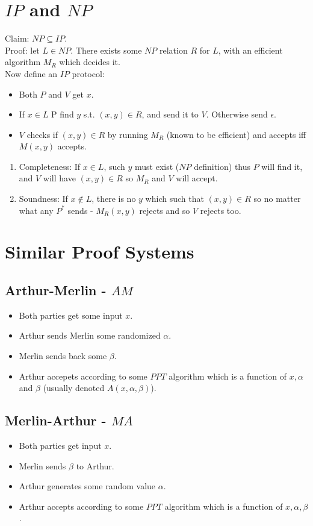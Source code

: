 \section*{$IP$ and $NP$}
Claim:
$NP\subseteq IP$.\\
Proof: let $L\in NP$.
There exists some $NP$ relation $R$ for $L$, with an efficient algorithm $M_R$ which decides it.\\
Now define an $IP$ protocol:\\
\begin{itemize}
    \item Both $P$ and $V$ get $x$.
    \item If $x\in L$ P find $y$ s.t. $(x,y)\in R$, and send it to $V$. Otherwise send $\epsilon$.
    \item $V$ checks if $(x,y)\in R$ by running $M_R$ (known to be efficient) and accepts iff $M(x,y)$ accepts.
\end{itemize}
\begin{enumerate}
    \item Completeness: If $x\in L$, such $y$ must exist ($NP$ definition) thus $P$ will find it, and $V$ will have $(x,y)\in R$ so $M_R$ and $V$ will accept.
    \item Soundness: If $x\notin L$, there is no $y$ which such that $(x,y)\in R$ so no matter what any $P^*$ sends - $M_R(x,y)$ rejects and so $V$ rejects too.
 \end{enumerate}

\section*{Similar Proof Systems}
\subsection*{Arthur-Merlin - $AM$}
\begin{itemize}
    \item Both parties get some input $x$.
    \item Arthur sends Merlin some randomized $\alpha$.
    \item Merlin sends back some $\beta$.
    \item Arthur accepets according to some $PPT$ algorithm which is a function of $x,\alpha$ and $\beta$ (usually denoted $A(x,\alpha,\beta)$).
\end{itemize}

\subsection*{Merlin-Arthur - $MA$}
\begin{itemize}
    \item Both parties get input $x$.
    \item Merlin sends $\beta$ to Arthur.
    \item Arthur generates some random value $\alpha$.
    \item Arthur accepts according to some $PPT$ algorithm which is a function of $x,\alpha,\beta$.
\end{itemize}

